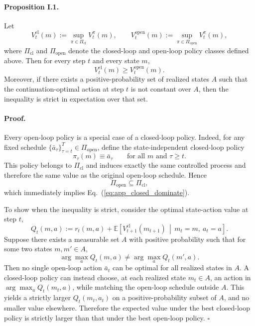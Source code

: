 \paragraph{Proposition I.1.}
Let
\begin{equation}
V_t^{\mathrm{cl}}(m)
:=
\sup_{\pi \in \Pi_{\mathrm{cl}}} V_t^{\pi}(m),
\qquad
V_t^{\mathrm{open}}(m)
:=
\sup_{\pi \in \Pi_{\mathrm{open}}} V_t^{\pi}(m),
\label{eq:app_closed_optvals}
\end{equation}
where \(\Pi_{\mathrm{cl}}\) and \(\Pi_{\mathrm{open}}\) denote the closed-loop and open-loop policy classes defined above.
Then for every step \(t\) and every state \(m\),
\begin{equation}
V_t^{\mathrm{cl}}(m)\ge V_t^{\mathrm{open}}(m).
\label{eq:app_closed_dominate}
\end{equation}
Moreover, if there exists a positive-probability set of realized states \(A\) such that the continuation-optimal action at step \(t\) is not constant over \(A\), then the inequality is strict in expectation over that set.

\paragraph{Proof.}
Every open-loop policy is a special case of a closed-loop policy.
Indeed, for any fixed schedule \(\{\bar a_{\tau}\}_{\tau=t}^{T}\in\Pi_{\mathrm{open}}\), define the state-independent closed-loop policy
\begin{equation}
\pi_{\tau}(m) \equiv \bar a_{\tau}
\qquad \text{for all } m \text{ and } \tau\ge t.
\label{eq:app_closed_embed}
\end{equation}
This policy belongs to \(\Pi_{\mathrm{cl}}\) and induces exactly the same controlled process and therefore the same value as the original open-loop schedule.
Hence
\begin{equation}
\Pi_{\mathrm{open}} \subseteq \Pi_{\mathrm{cl}},
\label{eq:app_closed_subset}
\end{equation}
which immediately implies Eq.~(\ref{eq:app_closed_dominate}).

To show when the inequality is strict, consider the optimal state-action value at step \(t\),
\begin{equation}
Q_t(m,a)
:=
r_t(m,a)
+
\mathbb{E}\!\left[
V_{t+1}^{\mathrm{cl}}(m_{t+1})
\,\middle|\,
m_t=m,\ a_t=a
\right].
\label{eq:app_closed_Q}
\end{equation}
Suppose there exists a measurable set \(A\) with positive probability such that for some two states \(m,m'\in A\),
\begin{equation}
\arg\max_{a} Q_t(m,a) \neq \arg\max_{a} Q_t(m',a).
\label{eq:app_closed_nonconstant}
\end{equation}
Then no single open-loop action \(\bar a_t\) can be optimal for all realized states in \(A\).
A closed-loop policy can instead choose, at each realized state \(m_t\in A\), an action in \(\arg\max_a Q_t(m_t,a)\), while matching the open-loop schedule outside \(A\).
This yields a strictly larger \(Q_t(m_t,a_t)\) on a positive-probability subset of \(A\), and no smaller value elsewhere.
Therefore the expected value under the best closed-loop policy is strictly larger than that under the best open-loop policy.
\hfill\(\square\)

